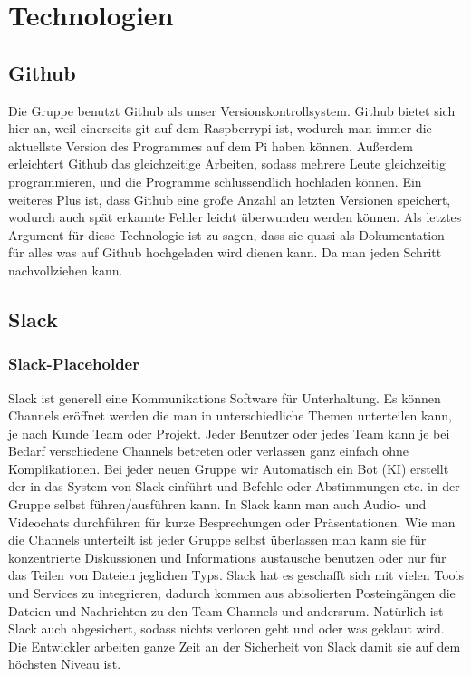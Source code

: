 \documentclass{report}
\begin{document}
\section{Technologien}

\subsection{Github}

Die Gruppe benutzt Github als unser Versionskontrollsystem. Github bietet sich hier an, weil einerseits git auf dem Raspberrypi ist, wodurch man immer die aktuellste Version des Programmes auf dem Pi haben k\"{o}nnen. Au{\ss}erdem erleichtert Github das gleichzeitige Arbeiten, sodass mehrere Leute gleichzeitig programmieren, und die Programme schlussendlich hochladen k\"{o}nnen. Ein weiteres Plus ist, dass Github eine gro{\ss}e Anzahl an letzten Versionen speichert, wodurch auch sp\"{a}t erkannte Fehler leicht \"{u}berwunden werden k\"{o}nnen. Als letztes Argument f\"{u}r diese Technologie ist zu sagen, dass sie quasi als Dokumentation f\"{u}r alles was auf Github hochgeladen wird dienen kann. Da man jeden Schritt nachvollziehen kann. 

\subsection{Slack}

\subsubsection{Slack-Placeholder}

Slack ist generell eine Kommunikations Software f\"{u}r Unterhaltung. Es k\"{o}nnen Channels er\"{o}ffnet werden die man in unterschiedliche Themen unterteilen kann, je nach Kunde Team oder Projekt. Jeder Benutzer oder jedes Team kann je bei Bedarf verschiedene Channels betreten oder verlassen ganz einfach ohne Komplikationen. Bei jeder neuen Gruppe wir Automatisch ein Bot (KI) erstellt der in das System von Slack einf\"{u}hrt und Befehle oder Abstimmungen etc. in der Gruppe selbst f\"{u}hren/ausf\"{u}hren kann. In Slack kann man auch Audio- und Videochats durchf\"{u}hren f\"{u}r kurze Besprechungen oder Pr\"{a}sentationen.  Wie man die Channels unterteilt ist jeder Gruppe selbst \"{u}berlassen man kann sie f\"{u}r konzentrierte Diskussionen und Informations austausche benutzen oder nur f\"{u}r das Teilen von Dateien jeglichen Typs. Slack hat es geschafft sich mit vielen Tools und Services zu integrieren, dadurch kommen aus abisolierten Posteing\"{a}ngen die Dateien und Nachrichten zu den Team Channels und andersrum. Nat\"{u}rlich ist Slack auch abgesichert, sodass nichts verloren geht und oder was geklaut wird. Die Entwickler arbeiten ganze Zeit an der Sicherheit von Slack damit sie auf dem h\"{o}chsten Niveau ist.
\end{document}
